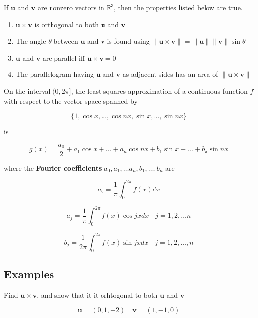 \documentclass{report}
\begin{document}
\begin{tcolorbox}[title = Geometric Properties of the Cross Product]
	If $\bm{u}$ and $\bm{v}$ are nonzero vectors in $\mathbb{R}^3$, then the properties listed below are true.
	
	\begin{enumerate}
		\item $\bm{u} \times \bm{v}$ is orthogonal to both $\bm{u}$ and $\bm{v}$
		\item The angle $\theta$ between $\bm{u}$ and $\bm{v}$ is found using $\| \bm{u} \times \bm{v} \| = \| \bm{u} \| \| \bm{v} \| \sin \theta$
		\item $\bm{u}$ and $\bm{v}$ are parallel iff $\bm{u} \times \bm{v} = 0$
		\item The parallelogram having $\bm{u}$ and $\bm{v}$ as adjacent sides has an area of $\| \bm{u} \times \bm{v} \|$
	\end{enumerate}
\end{tcolorbox}

\begin{tcolorbox}[title = Fourier Approximation]
	On the interval $(0, 2\pi]$, the least squares approximation of a continuous function $f$ with respect to the vector space spanned by 
	
	$$
	\{ 1, \cos x, \hdots, \cos nx, \sin x, \hdots, \sin nx\}
	$$
	
	is 
	
	$$
	g(x) = \frac{a_0}{2} + a_1 \cos x + \hdots + a_n \cos nx + b_1 \sin x + \hdots + b_n \sin nx
	$$
	
	where the \textbf{Fourier coefficients} $a_0, a_1, \hdots a_n, b_1, \hdots, b_n$ are
	
	$$
	a_0 = \frac{1}{\pi} \int_0^{2\pi} f(x)dx
	$$
	
	$$
	a_j = \frac{1}{\pi}	\int_0^{2\pi} f(x) \cos jx dx \quad j = 1, 2, \hdots n
	$$
	
	$$
	b_j = \frac{1}{2\pi} \int_0^{2\pi} f(x) \sin jx dx \quad j = 1, 2, \hdots, n
	$$
\end{tcolorbox}

\subsection{Examples}

\begin{tcolorbox}[colframe = lightred]
	Find $\bm{u} \times \bm{v}$, and show that it it orhtogonal to both $\bm{u}$ and $\bm{v}$ 
	
	$$
	\bm{u} = (0,1,-2) \quad \bm{v} = (1,-1,0)
	$$
\end{tcolorbox}
\end{document}
